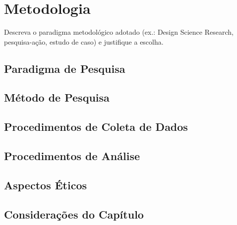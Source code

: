 
\chapter{Metodologia}
\label{cap:metodologia}

Descreva o paradigma metodológico adotado (ex.: Design Science
Research, pesquisa-ação, estudo de caso) e justifique a escolha.

\section{Paradigma de Pesquisa}

\section{Método de Pesquisa}

\section{Procedimentos de Coleta de Dados}

\section{Procedimentos de Análise}

\section{Aspectos Éticos}

\section{Considerações do Capítulo}
